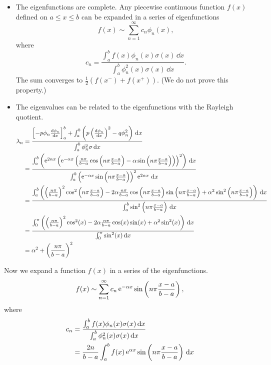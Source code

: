 {\begin{Solution}
\begin{itemize}
\begin{align*}
      &= 0 \quad \mathrm{if}\ n \neq m
    \end{align*}
  \item   
    The eigenfunctions are complete.  Any piecewise continuous function
    $f(x)$ defined on $a \leq x \leq b$ can be expanded in a series of 
    eigenfunctions
    \[ 
    f(x) \sim \sum_{n = 1}^\infty c_n \phi_n(x),
    \]
    where
    \[ 
    c_n = \frac{\int_a^b f(x) \phi_n(x) \sigma(x)\,\dd x}
    {\int_a^b \phi_n^2(x) \sigma(x)\,\dd x}.
    \]
    The sum converges to $\frac{1}{2}(f(x^-) + f(x^+))$.
    (We do not prove this property.)
  \item   
    The eigenvalues can be related to the eigenfunctions with 
    the Rayleigh quotient.
    \begin{align*} 
      \lambda_n 
      &= \frac{ \left[ - p \phi_n \frac{\mathrm{d} \phi_n}{\mathrm{d} x} \right]_a^b + \int_a^b
        \left( p \left(\frac{\mathrm{d} \phi_n}{\mathrm{d} x}\right)^2-q\phi_n^2
        \right)\,\mathrm{d} x}
      {\int_a^b \phi_n^2 \sigma\,\mathrm{d} x} \\
      &= \frac{ \int_a^b \left( \mathop{\mathrm{e}}\nolimits^{2 \alpha x} 
          \left( \mathop{\mathrm{e}}\nolimits^{-\alpha x} \left( 
              \frac{n \pi}{b-a} \cos \left( n \pi \frac{x-a}{b-a} \right)
              -\alpha \sin \left( n \pi \frac{x-a}{b-a} \right) \right)
          \right)^2
        \right)\,\mathrm{d} x}
      {\int_a^b \left( \mathop{\mathrm{e}}\nolimits^{-\alpha x} 
          \sin\left( n \pi \frac{x-a}{b-a} \right) \right)^2 
        \mathop{\mathrm{e}}\nolimits^{2 \alpha x} \,\mathrm{d} x} \\
      &= \frac{ \int_a^b \left( 
          \left( \frac{n \pi}{b-a} \right)^2 
          \cos^2 \left( n \pi \frac{x-a}{b-a} \right)
          -2 \alpha \frac{n \pi}{b-a} 
          \cos\left( n \pi \frac{x-a}{b-a} \right)
          \sin \left( n \pi \frac{x-a}{b-a} \right)
          + \alpha^2 \sin^2 \left( n \pi \frac{x-a}{b-a} \right)
        \right)\,\mathrm{d} x}
      {\int_a^b 
        \sin^2 \left( n \pi \frac{x-a}{b-a} \right)
        \,\mathrm{d} x} \\
      &= \frac{ \int_0^\pi \left( 
          \left( \frac{n \pi}{b-a} \right)^2 \cos^2(x)
          -2 \alpha \frac{n \pi}{b-a} \cos(x) \sin(x)
          + \alpha^2 \sin^2(x)
        \right)\,\mathrm{d} x}
      {\int_0^\pi \sin^2(x) \,\mathrm{d} x} \\
      &= \alpha^2 + \left( \frac{n \pi}{b-a} \right)^2
    \end{align*}
  \end{itemize}

  Now we expand a function $f(x)$ in a series of the eigenfunctions.
  \[ 
  f(x) \sim \sum_{n = 1}^\infty c_n
  \mathop{\mathrm{e}}\nolimits^{-\alpha x} \sin \left( n \pi \frac{x - a}{b - a} \right),
  \]
  where
  \begin{align*} 
    c_n     &= \frac{\int_a^b f(x) \phi_n(x) \sigma(x)\,\mathrm{d} x}
    {\int_a^b \phi_n^2(x) \sigma(x)\,\mathrm{d} x} \\
    &= \frac{2 n}{b-a} \int_a^b f(x) 
    \mathop{\mathrm{e}}\nolimits^{\alpha x} \sin \left( n \pi \frac{x - a}{b - a} \right)
    \,\mathrm{d} x
  \end{align*}
\end{Solution}






}
